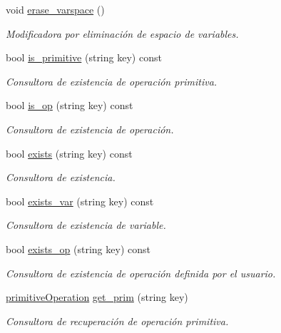 \begin{DoxyCompactItemize}
void \hyperlink{class_environment_a82a2e7e7920575b6e09b1dfaaf062f68}{erase\+\_\+varspace} ()
\begin{DoxyCompactList}\small\item\em Modificadora por eliminación de espacio de variables. \end{DoxyCompactList}\item 
bool \hyperlink{class_environment_a8949b818539cc0caae637f61f8271640}{is\+\_\+primitive} (string key) const 
\begin{DoxyCompactList}\small\item\em Consultora de existencia de operación primitiva. \end{DoxyCompactList}\item 
bool \hyperlink{class_environment_a18ebd27038386a636917cbb2bc1583df}{is\+\_\+op} (string key) const 
\begin{DoxyCompactList}\small\item\em Consultora de existencia de operación. \end{DoxyCompactList}\item 
bool \hyperlink{class_environment_a4b2500663ebbc031bfdb18b3301492c4}{exists} (string key) const 
\begin{DoxyCompactList}\small\item\em Consultora de existencia. \end{DoxyCompactList}\item 
bool \hyperlink{class_environment_ace3eae39aed1b747a18ab27e45dc96b7}{exists\+\_\+var} (string key) const 
\begin{DoxyCompactList}\small\item\em Consultora de existencia de variable. \end{DoxyCompactList}\item 
bool \hyperlink{class_environment_a323ca63fc26be47fa45d14dd783761e1}{exists\+\_\+op} (string key) const 
\begin{DoxyCompactList}\small\item\em Consultora de existencia de operación definida por el usuario. \end{DoxyCompactList}\item 
\hyperlink{class_environment_a3d2dfb3b9d5843e64fd24e5a2008029d}{primitive\+Operation} \hyperlink{class_environment_a15eff205405da84c7466ac8f1ea6a54c}{get\+\_\+prim} (string key)
\begin{DoxyCompactList}\small\item\em Consultora de recuperación de operación primitiva. \end{DoxyCompactList}\item 

\end{DoxyCompactItemize}
